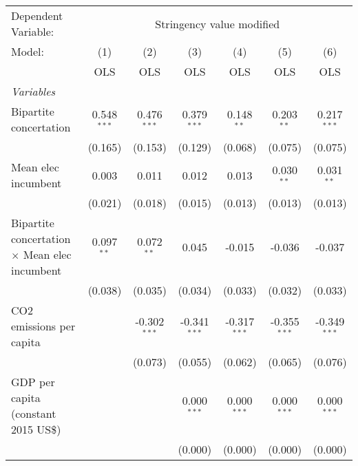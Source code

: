 
\begingroup
\centering
\begin{tabular}{lcccccc}
   \toprule
   Dependent Variable: & \multicolumn{6}{c}{Stringency value modified}\\
   Model:                                               & (1)           & (2)            & (3)            & (4)            & (5)            & (6)\\  
                                                        &  OLS          & OLS            & OLS            & OLS            & OLS            & OLS\\  
   \midrule
   \emph{Variables}\\
   Bipartite concertation                               & 0.548$^{***}$ & 0.476$^{***}$  & 0.379$^{***}$  & 0.148$^{**}$   & 0.203$^{**}$   & 0.217$^{***}$\\   
                                                        & (0.165)       & (0.153)        & (0.129)        & (0.068)        & (0.075)        & (0.075)\\   
   Mean elec incumbent                                  & 0.003         & 0.011          & 0.012          & 0.013          & 0.030$^{**}$   & 0.031$^{**}$\\   
                                                        & (0.021)       & (0.018)        & (0.015)        & (0.013)        & (0.013)        & (0.013)\\   
   Bipartite concertation $\times$ Mean elec incumbent  & 0.097$^{**}$  & 0.072$^{**}$   & 0.045          & -0.015         & -0.036         & -0.037\\   
                                                        & (0.038)       & (0.035)        & (0.034)        & (0.033)        & (0.032)        & (0.033)\\   
   CO2 emissions per capita                             &               & -0.302$^{***}$ & -0.341$^{***}$ & -0.317$^{***}$ & -0.355$^{***}$ & -0.349$^{***}$\\   
                                                        &               & (0.073)        & (0.055)        & (0.062)        & (0.065)        & (0.076)\\   
   GDP per capita (constant 2015 US\$)                  &               &                & 0.000$^{***}$  & 0.000$^{***}$  & 0.000$^{***}$  & 0.000$^{***}$\\   
                                                        &               &                & (0.000)        & (0.000)        & (0.000)        & (0.000)\\   

\end{tabular}

